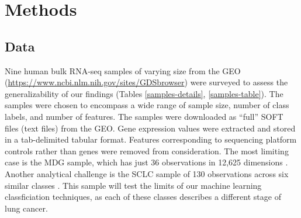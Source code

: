 \documentclass{article}
\begin{document}
\section{Methods}

\subsection{Data}

Nine human bulk RNA-seq samples of varying size from the GEO (\url{https://www.ncbi.nlm.nih.gov/sites/GDSbrowser}) were surveyed to assess the generalizability of our findings (Tables \ref{samples-details}, \ref{samples-table}). The samples were chosen to encompass a wide range of sample size, number of class labels, and number of features. The samples were downloaded as ``full'' SOFT files (text files) from the GEO. Gene expression values were extracted and stored in a tab-delimited tabular format. Features corresponding to sequencing platform controls rather than genes were removed from consideration. The most limiting case is the MDG sample, which has just 36 observations in 12,625 dimensions \cite{MDG_paper}. Another analytical challenge is the SCLC sample of 130 observations across six similar classes \cite{SCLC_paper}. This sample will test the limits of our machine learning classficiation techniques, as each of these classes describes a different stage of lung cancer. 
\end{document}
